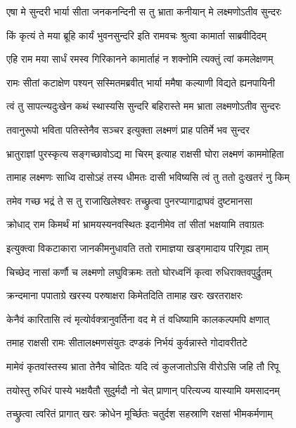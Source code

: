 \twolineshloka
{एषा मे सुन्दरी भार्या सीता जनकनन्दिनी}
{स तु भ्राता कनीयान् मे लक्ष्मणोऽतीव सुन्दरः} %

\twolineshloka
{किं कृत्यं ते मया ब्रूहि कार्यं भुवनसुन्दरि}
{इति रामवचः श्रुत्वा कामार्ता साब्रवीदिदम्} %

\twolineshloka
{एहि राम मया सार्धं रमस्व गिरिकानने}
{कामार्ताहं न शक्नोमि त्यक्तुं त्वां कमलेक्षणम्} %

\twolineshloka
{रामः सीतां कटाक्षेण पश्यन् सस्मितमब्रवीत्}
{भार्या ममैषा कल्याणी विद्यते ह्यनपायिनी} %

\twolineshloka
{त्वं तु सापत्न्यदुःखेन कथं स्थास्यसि सुन्दरि}
{बहिरास्ते मम भ्राता लक्ष्मणोऽतीव सुन्दरः} %

\twolineshloka
{तवानुरूपो भविता पतिस्तेनैव सञ्चर}
{इत्युक्ता लक्ष्मणं प्राह पतिर्मे भव सुन्दर} %

\twolineshloka
{भ्रातुराज्ञां पुरस्कृत्य सङ्गच्छावोऽद्य मा चिरम्}
{इत्याह राक्षसी घोरा लक्ष्मणं काममोहिता} %

\twolineshloka
{तामाह लक्ष्मणः साध्वि दासोऽहं तस्य धीमतः}
{दासी भविष्यसि त्वं तु ततो दुःखतरं नु किम्} %

\twolineshloka
{तमेव गच्छ भद्रं ते स तु राजाखिलेश्वरः}
{तच्छ्रुत्वा पुनरप्यागाद्राघवं दुष्टमानसा} %

\twolineshloka
{क्रोधाद् राम किमर्थं मां भ्रामयस्यनवस्थितः}
{इदानीमेव तां सीतां भक्षयामि तवाग्रतः} %

\twolineshloka
{इत्युक्त्वा विकटाकारा जानकीमनुधावति}
{ततो रामाज्ञया खड्गमादाय परिगृह्य ताम्} %

\twolineshloka
{चिच्छेद नासां कर्णौ च लक्ष्मणो लघुविक्रमः}
{ततो घोरध्वनिं कृत्वा रुधिराक्तवपुर्द्रुतम्} %

\twolineshloka
{क्रन्दमाना पपाताग्रे खरस्य परुषाक्षरा}
{किमेतदिति तामाह खरः खरतराक्षरः} %

\twolineshloka
{केनैवं कारितासि त्वं मृत्योर्वक्त्रानुवर्तिना}
{वद मे तं वधिष्यामि कालकल्पमपि क्षणात्} %

\twolineshloka
{तमाह राक्षसी रामः सीतालक्ष्मणसंयुतः}
{दण्डकं निर्भयं कुर्वन्नास्ते गोदावरीतटे} %

\twolineshloka
{मामेवं कृतवांस्तस्य भ्राता तेनैव चोदितः}
{यदि त्वं कुलजातोऽसि वीरोऽसि जहि तौ रिपू} %

\twolineshloka
{तयोस्तु रुधिरं पास्ये भक्षयैतौ सुदुर्मदौ}
{नो चेत् प्राणान् परित्यज्य यास्यामि यमसादनम्} %

\twolineshloka
{तच्छ्रुत्वा त्वरितं प्रागात् खरः क्रोधेन मूर्च्छितः}
{चतुर्दश सहस्राणि रक्षसां भीमकर्मणाम्} %

